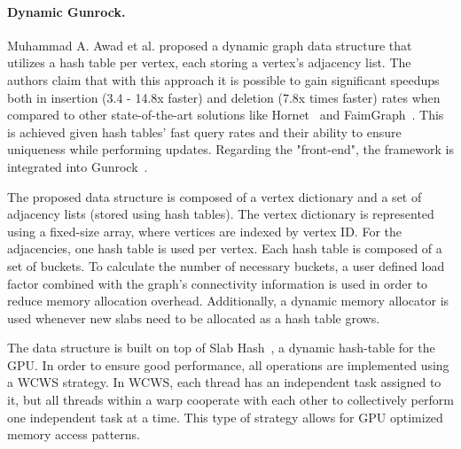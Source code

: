     \paragraph{\textbf{Dynamic Gunrock}.} 
    Muhammad A. Awad et al. \cite{paper:dynamic_graph_gpu} proposed a dynamic graph data structure that utilizes a hash table per vertex, each storing a vertex's adjacency list. The authors claim that with this approach it is possible to gain significant speedups both in insertion (3.4 - 14.8x faster) and deletion (7.8x times faster) rates when compared to other state-of-the-art solutions like Hornet~\cite{paper:hornet} and FaimGraph~\cite{paper:faimgraph}. This is achieved given hash tables' fast query rates and their ability to ensure uniqueness while performing updates. Regarding the "front-end", the framework is integrated into Gunrock~\cite{paper:gunrock}.


    The proposed data structure is composed of a vertex dictionary and a set of adjacency lists (stored using hash tables). The vertex dictionary is represented using a fixed-size array, where vertices are indexed by vertex ID. For the adjacencies, one hash table is used per vertex. Each hash table is composed of a set of buckets. To calculate the number of necessary buckets, a user defined load factor combined with the graph's connectivity information is used in order to reduce memory allocation overhead. Additionally, a dynamic memory allocator is used whenever new slabs need to be allocated as a hash table grows.

    The data structure is built on top of Slab Hash~\cite{paper:slablhash}, a dynamic hash-table for the \gls{GPU}. In order to ensure good performance, all operations are implemented using a \gls{WCWS} strategy. In \gls{WCWS}, each thread has an independent task assigned to it, but all threads within a warp cooperate with each other to collectively perform one independent task at a time. This type of strategy allows for \gls{GPU} optimized memory access patterns.

